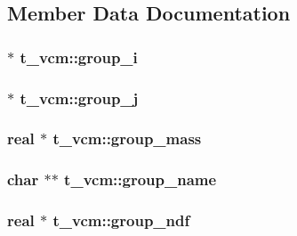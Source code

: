 \subsection{\-Member \-Data \-Documentation}
\hypertarget{structt__vcm_ae89343f524e14c31a2dacf3b39acd746}{
\subsubsection[{group\-\_\-i}]{ $\ast$ {\bf t\-\_\-vcm\-::group\-\_\-i}}}\label{structt__vcm_ae89343f524e14c31a2dacf3b39acd746}
\hypertarget{structt__vcm_a4e94951ccebd74d5bca32f2440e8736d}{
\subsubsection[{group\-\_\-j}]{ $\ast$ {\bf t\-\_\-vcm\-::group\-\_\-j}}}\label{structt__vcm_a4e94951ccebd74d5bca32f2440e8736d}
\hypertarget{structt__vcm_a5c011b467bc3b682ff811bcbd306e7eb}{
\subsubsection[{group\-\_\-mass}]{\setlength{\rightskip}{0pt plus 5cm}real $\ast$ {\bf t\-\_\-vcm\-::group\-\_\-mass}}}\label{structt__vcm_a5c011b467bc3b682ff811bcbd306e7eb}
\hypertarget{structt__vcm_adc98417493592c68b923d20df972c384}{
\subsubsection[{group\-\_\-name}]{\setlength{\rightskip}{0pt plus 5cm}char $\ast$$\ast$ {\bf t\-\_\-vcm\-::group\-\_\-name}}}\label{structt__vcm_adc98417493592c68b923d20df972c384}
\hypertarget{structt__vcm_af3abbea38b643bdeebd2ace7116e7fae}{
\subsubsection[{group\-\_\-ndf}]{\setlength{\rightskip}{0pt plus 5cm}real $\ast$ {\bf t\-\_\-vcm\-::group\-\_\-ndf}}}\label{structt__vcm_af3abbea38b643bdeebd2ace7116e7fae}
